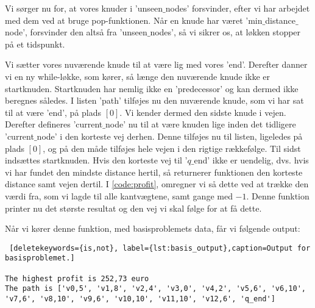 Vi sørger nu for, at vores knuder i 'unseen$\_$nodes' forsvinder, efter vi har arbejdet med dem ved at bruge pop-funktionen. Når en knude har været 'min$\_$distance$\_$node', forsvinder den altså fra 'unseen$\_$nodes', så vi sikrer os, at løkken stopper på et tidspunkt. 

Vi sætter vores nuværende knude til at være lig med vores 'end'.
Derefter danner vi en ny while-løkke, som kører, så længe den nuværende knude ikke er startknuden. Startknuden har nemlig ikke en 'predecessor' og kan dermed ikke beregnes således. I listen 'path' tilføjes nu den nuværende knude, som vi har sat til at være 'end', på plads $[0]$. Vi kender dermed den sidste knude i vejen. Derefter defineres 'current$\_$node' nu til at være knuden lige inden det tidligere 'current$\_$node' i den korteste vej derhen. Denne tilføjes nu til listen, ligeledes på plads $[0]$, og på den måde tilføjes hele vejen i den rigtige rækkefølge. Til sidst indsættes startknuden.
Hvis den korteste vej til '$q\_$end' ikke er uendelig, dvs. hvis vi har fundet den mindste distance hertil, så returnerer funktionen den korteste distance samt vejen dertil.
I \autoref{code:profit}, omregner vi så dette ved at trække den værdi fra, som vi lagde til alle kantvægtene, samt gange med $-1$. Denne funktion printer nu det største resultat og den vej vi skal følge for at få dette. 

 

Når vi kører denne funktion, med basisproblemets data, får vi følgende output:

\begin{lstlisting} [deletekeywords={is,not}, label={lst:basis_output},caption=Output for basisproblemet.]

The highest profit is 252,73 euro
The path is ['v0,5', 'v1,8', 'v2,4', 'v3,0', 'v4,2', 'v5,6', 'v6,10', 'v7,6', 'v8,10', 'v9,6', 'v10,10', 'v11,10', 'v12,6', 'q_end']

\end{lstlisting}
